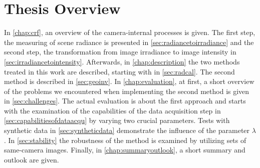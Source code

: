\section{Thesis Overview}
\label{sec:overview}
In \autoref{chap:crf}, an overview of the camera-internal processes is given. The first step, the measuring of scene radiance is presented in \autoref{sec:radiancetoirradiance} and the second step, the transformation from image irradiance to image intensity in \autoref{sec:irradiancetointensity}. Afterwards, in \autoref{chap:description} the two methods treated in this work are described, starting with \cite{Lin04radiometriccalibration} in \autoref{sec:radcal}. The second method \cite{ng_cvpr07} is described in \autoref{sec:geoinv}. In \autoref{chap:evaluation}, at first, a short overview of the problems we encountered when implementing the second method is given in \autoref{sec:challenges}. The actual evaluation is about the first approach and starts with the examination of the capabilities of the data acquisition step in \autoref{sec:capabilitiesofdataacqu} by varying two crucial parameters. Tests with synthetic data in \autoref{sec:syntheticdata} demonstrate the influence of the parameter $\lambda$. In \autoref{sec:stability} the robustness of the method is examined by utilizing sets of same-camera images. Finally, in \autoref{chap:summaryoutlook}, a short summary and outlook are given.